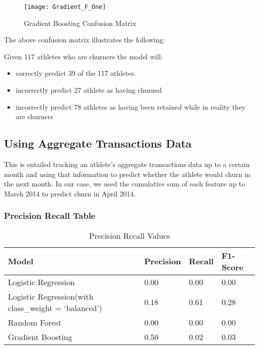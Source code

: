 \documentclass[
10pt, %
a4paper, %
oneside, %
headinclude,footinclude, %
BCOR5mm, %
]{scrartcl}
\begin{document}
\begin{figure}[H]
\centering 
\texttt{[image: Gradient\_F\_One]} 
\caption[Lostic Regression Confusion Matrix]{Gradient Boosting Confusion Matrix} %
\label{fig:gallery} 
\end{figure}

The above confusion matrix illustrates the following: 

Given 117 athletes who are churners the model will:

\begin{itemize}
\item correctly predict 39 of the 117 athletes. 
\item incorrectly predict 27 athlete as having churned 
\item incorrectly predict 78 athletes as having been retained while in reality they are churners
\end{itemize}



\subsection{Using Aggregate Transactions Data}

This is entailed tracking an athlete's aggregate transactions data up to a certain month and using that information to predict whether the athlete would churn in the next month. In our case, we used the cumulative sum of each feature up to March 2014 to predict churn in April 2014.

\subsubsection{Precision Recall Table} 

\begin{table}[H]
\centering
\caption{Precision Recall Values}
\label{my-label}
\begin{tabular}{@{}llll@{}}
\toprule
Model               & Precision & Recall & F1-Score \\ \midrule
Logistic Regression & 0.00      & 0.00   & 0.00     \\
Logistic Regression(with class\_weight = `balanced') & 0.18      & 0.61   & 0.28     \\
Random Forest       & 0.00      & 0.00   & 0.00     \\
Gradient Boosting   & 0.50      & 0.02   & 0.03     \\ \bottomrule
\end{tabular}
\end{table}
\end{document}
